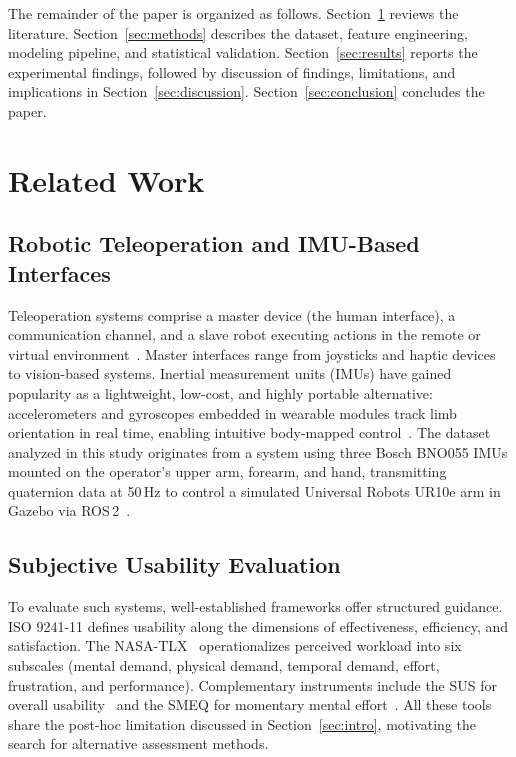 The remainder of the paper is organized as follows. Section~\ref{sec:related} reviews the literature. Section~\ref{sec:methods} describes the dataset, feature engineering, modeling pipeline, and statistical validation. Section~\ref{sec:results} reports the experimental findings, followed by discussion of findings, limitations, and implications in Section~\ref{sec:discussion}. Section~\ref{sec:conclusion} concludes the paper.

\section{Related Work}
\label{sec:related}


\subsection{Robotic Teleoperation and IMU-Based Interfaces}

Teleoperation systems comprise a master device (the human interface), a communication channel, and a slave robot executing actions in the remote or virtual environment~\cite{lichiardopol2007}. Master interfaces range from joysticks and haptic devices to vision-based systems. Inertial measurement units (IMUs) have gained popularity as a lightweight, low-cost, and highly portable alternative: accelerometers and gyroscopes embedded in wearable modules track limb orientation in real time, enabling intuitive body-mapped control~\cite{ahmad2013}. The dataset analyzed in this study originates from a system using three Bosch BNO055 IMUs mounted on the operator's upper arm, forearm, and hand, transmitting quaternion data at 50\,Hz to control a simulated Universal Robots UR10e arm in Gazebo via ROS\,2~\cite{fornaro2024}.

\subsection{Subjective Usability Evaluation}

To evaluate such systems, well-established frameworks offer structured guidance. ISO 9241-11 defines usability along the dimensions of effectiveness, efficiency, and satisfaction. The NASA-TLX~\cite{hart1988} operationalizes perceived workload into six subscales (mental demand, physical demand, temporal demand, effort, frustration, and performance). Complementary instruments include the SUS for overall usability~\cite{brooke1996} and the SMEQ for momentary mental effort~\cite{wong2017}. All these tools share the post-hoc limitation discussed in Section~\ref{sec:intro}, motivating the search for alternative assessment methods.

